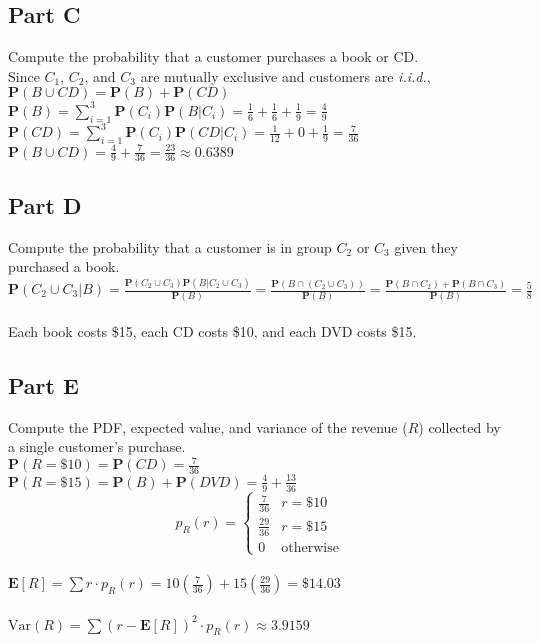 \documentclass{amsart}
\begin{document}
	\subsection{Part C}
	Compute the probability that a customer purchases a book or CD.\\
	Since $C_1$, $C_2$, and $C_3$ are mutually exclusive and customers are \textit{i.i.d.},\\
	$\mathbf{P}(B\cup CD) = \mathbf{P}(B) + \mathbf{P}(CD)$\\
	$\mathbf{P}(B) = \sum_{i=1}^{3} \mathbf{P}(C_i)\mathbf{P}(B|C_i) = \frac{1}{6} + \frac{1}{6} + \frac{1}{9} = \frac{4}{9}$\\
	$\mathbf{P}(CD) = \sum_{i=1}^{3} \mathbf{P}(C_i)\mathbf{P}(CD|C_i) = \frac{1}{12} + 0 + \frac{1}{9} = \frac{7}{36}$\\
	$\mathbf{P}(B\cup CD) = \frac{4}{9} + \frac{7}{36} = \frac{23}{36} \approx 0.6389$\\
	\subsection{Part D}
	Compute the probability that a customer is in group $C_2$ or $C_3$ given they purchased a book.\\
	$\mathbf{P}(C_2 \cup C_3 | B) = \frac{\mathbf{P}(C_2 \cup C_3) \mathbf{P}(B|C_2 \cup C_3)}{\mathbf{P}(B)}=
	\frac{\mathbf{P}(B \cap (C_2 \cup C_3))}{\mathbf{P}(B)} = \frac{\mathbf{P}(B \cap C_2) + \mathbf{P}(B \cap C_3)}{\mathbf{P}(B)} = \frac{5}{8}$\\
	\\
	Each book costs \$15, each CD costs \$10, and each DVD costs \$15.
	\subsection{Part E}
	Compute the PDF, expected value, and variance of the revenue ($R$) collected by a single customer's purchase.
	\\
	$\mathbf{P}(R=\text{\$10})=\mathbf{P}(CD) = \frac{7}{36}$\\
	$\mathbf{P}(R=\text{\$15})=\mathbf{P}(B)+\mathbf{P}(DVD) = \frac{4}{9}+\frac{13}{36}$\\
	\[
	p_R(r) = 
	\begin{cases}
		\frac{7}{36} & r = \$10\\
		\frac{29}{36} & r = \$15\\
		0 & \text{otherwise}
	\end{cases}
	\]\\
	$\mathbf{E}[R] = \sum r \cdot p_R(r) = 10(\frac{7}{36}) + 15(\frac{29}{36}) = \$14.03$\\\\
	$\text{Var}(R) = \sum (r-\textbf{E}[R])^2 \cdot p_R(r) \approx 3.9159$\\
\end{document}
